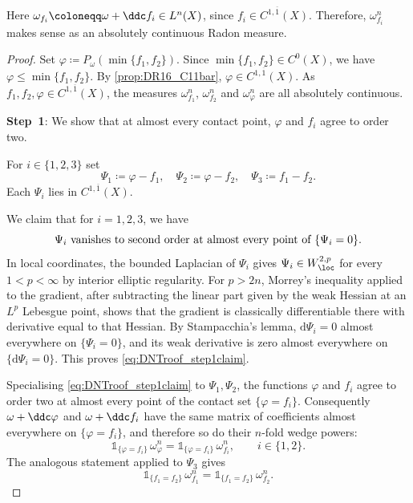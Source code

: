 Here $\omega_{f_i}\coloneqq \omega+\ddc f_i\in L^n(X)$, since $f_i\in C^{1,\overline{1}}(X)$. Therefore, $\omega_{f_i}^n$ makes sense as an absolutely continuous Radon measure.

\begin{proof}
Set $\varphi\coloneqq P_\omega(\min\{f_1,f_2\})$. Since $\min\{f_1,f_2\}\in C^0(X)$, we have $\varphi\leq \min\{f_1,f_2\}$. By \cref{prop:DR16_C11bar}, $\varphi\in C^{1,\overline{1}}(X)$. As $f_1,f_2,\varphi\in C^{1,\overline{1}}(X)$, the measures $\omega^n_{f_1}$, $\omega^n_{f_2}$ and $\omega^n_\varphi$ are all absolutely continuous.

\textbf{Step~1}: We show that at almost every contact point, $\varphi$ and $f_i$ agree to order two.

For $i\in\{1,2,3\}$ set
\[
\Psi_1\coloneqq \varphi-f_1,\quad \Psi_2\coloneqq \varphi-f_2,\quad \Psi_3\coloneqq f_1-f_2.
\]
Each $\Psi_i$ lies in $C^{1,\overline{1}}(X)$.

We claim that for $i=1,2,3$, we have
\begin{equation}\label{eq:DNTroof_step1claim}
\Psi_i\textup{ vanishes to second order at almost every point of }\{\Psi_i=0\}.
\end{equation}
In local coordinates, the bounded Laplacian of $\Psi_i$ gives $\Psi_i\in W^{2,p}_{\loc}$ for every $1<p<\infty$ by interior elliptic regularity. For $p>2n$, Morrey's inequality applied to the gradient, after subtracting the linear part given by the weak Hessian at an $L^p$ Lebesgue point, shows that the gradient is classically differentiable there with derivative equal to that Hessian. By Stampacchia's lemma, $\mathrm{d}\Psi_i=0$ almost everywhere on $\{\Psi_i=0\}$, and its weak derivative is zero almost everywhere on $\{\mathrm{d}\Psi_i=0\}$. This proves \eqref{eq:DNTroof_step1claim}.

Specialising \eqref{eq:DNTroof_step1claim} to $\Psi_1,\Psi_2$, the functions $\varphi$ and $f_i$ agree to order two at almost every point of the contact set $\{\varphi=f_i\}$. Consequently $\omega+\ddc \varphi$ and $\omega+\ddc f_i$ have the same matrix of coefficients almost everywhere on $\{\varphi=f_i\}$, and therefore so do their $n$-fold wedge powers:
\begin{equation}\label{eq:DNTroof_step1eq}
\mathds{1}_{\{\varphi=f_i\}}\,\omega^n_\varphi = \mathds{1}_{\{\varphi=f_i\}}\,\omega^n_{f_i},\qquad i\in\{1,2\}.
\end{equation}
The analogous statement applied to $\Psi_3$ gives
\begin{equation}\label{eq:DNTroof_step1eqf12}
\mathds{1}_{\{f_1=f_2\}}\,\omega^n_{f_1} = \mathds{1}_{\{f_1=f_2\}}\,\omega^n_{f_2}.
\end{equation}


\end{proof}
